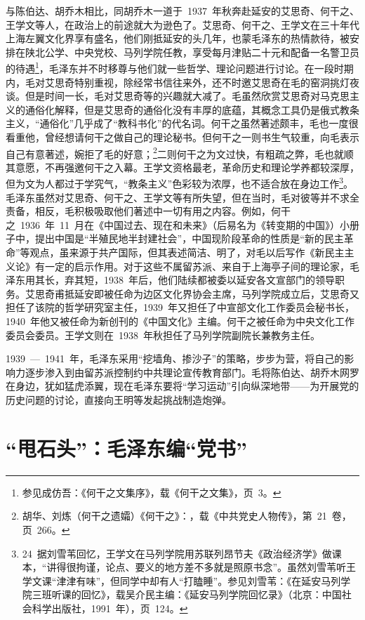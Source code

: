 与陈伯达、胡乔木相比，同胡乔木一道于~1937~年秋奔赴延安的艾思奇、何干之、王学文等人，在政治上的前途就大为逊色了。艾思奇、何干之、王学文在三十年代上海左翼文化界享有盛名，他们刚抵延安的头几年，也蒙毛泽东的热情款待，被安排在陕北公学、中央党校、马列学院任教，享受每月津贴二十元和配备一名警卫员的待遇\footnote{参见成仿吾：《何干之文集序》，载《何干之文集》，页~3。}，毛泽东并不时移尊与他们就一些哲学、理论问题进行讨论。在一段时期内，毛对艾思奇特别重视，除经常书信往来外，还不时邀艾思奇在毛的窑洞挑灯夜谈。但是时间一长，毛对艾思奇等的兴趣就大减了。毛虽然欣赏艾思奇对马克思主义的通俗化解释，但是艾思奇的通俗化没有丰厚的底蕴，其概念工具仍是俄式教条主义，“通俗化”几乎成了“教科书化”的代名词。何干之虽然著述颇丰，毛也一度很看重他，曾经想请何干之做自己的理论秘书。但何干之一则书生气较重，向毛表示自己有意著述，婉拒了毛的好意；\footnote{胡华、刘炼（何干之遗孀）《何干之》：，载《中共党史人物传》，第~21~卷，页~266。}二则何干之为文过快，有粗疏之弊，毛也就顺其意愿，不再强邀何干之入幕。王学文资格最老，革命历史和理论学养都较深厚，但为文为人都过于学究气，“教条主义”色彩较为浓厚，也不适合放在身边工作\footnote{24~据刘雪苇回忆，王学文在马列学院用苏联列昂节夫《政治经济学》做课本，“讲得很拘谨，论点、要义的地方差不多就是照原书念”。虽然刘雪苇听王学文课“津津有味”，但同学中却有人“打瞌睡”。参见刘雪苇：《在延安马列学院三班听课的回忆》，载吴介民主编：《延安马列学院回忆录》（北京：中国社会科学出版社，1991~年），页~124。}。毛泽东虽然对艾思奇、何干之、王学文等有所失望，但在当时，毛对彼等并不求全责备，相反，毛积极吸取他们著述中一切有用之内容。例如，何干之~1936~年~11~月在《中国过去、现在和未来》（后易名为《转变期的中国》）小册子中，提出中国是“半殖民地半封建社会”，中国现阶段革命的性质是“新的民主革命”等观点，虽来源于共产国际，但其表述简洁、明了，对毛以后写作《新民主主义论》有一定的启示作用。对于这些不属留苏派、来自于上海亭子间的理论家，毛泽东用其长，弃其短，1938~年后，他们陆续都被委以延安各文宣部门的领导职务。艾思奇甫抵延安即被任命为边区文化界协会主席，马列学院成立后，艾思奇又担任了该院的哲学研究室主任，1939~年又担任了中宣部文化工作委员会秘书长，1940~年他又被任命为新创刊的《中国文化》主编。何干之被任命为中央文化工作委员会委员。王学文则在~1938~年秋担任了马列学院副院长兼教务主任。

1939~—~1941~年，毛泽东采用“挖墙角、掺沙子”的策略，步步为营，将自己的影响力逐步渗入到由留苏派控制约中共理论宣传教育部门。毛将陈伯达、胡乔木网罗在身边，犹如猛虎添翼，现在毛泽东要将“学习运动”引向纵深地带——为开展党的历史问题的讨论，直接向王明等发起挑战制造炮弹。

\section{“甩石头”：毛泽东编“党书”}


